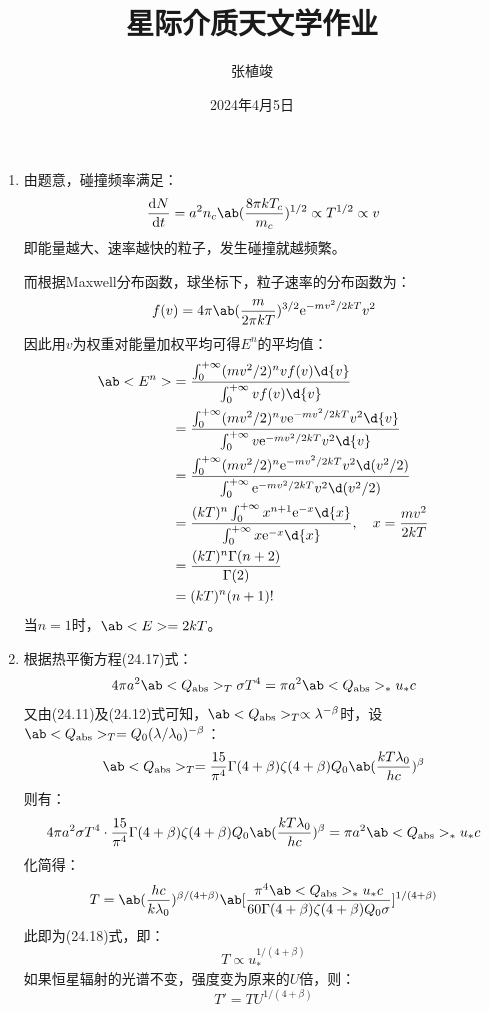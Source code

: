 \documentclass[a4paper,fontset=none]{ctexart}
\title{\textbf{星际介质天文学作业}}
\author{张植竣}
\date{2024年4月5日}
\begin{document}
\maketitle

\begin{enumerate}
    \item[24.1]
    由题意，碰撞频率满足：
    \[
        \odv{N}{t} = a^2 n_c \ab(\frac{8\pi kT_c}{m_c})^{1/2} \propto T^{1/2} \propto v
    \]
    即能量越大、速率越快的粒子，发生碰撞就越频繁。

    而根据Maxwell分布函数，球坐标下，粒子速率的分布函数为：
    \[
        f(v) = 4\pi \ab(\frac{m}{2\pi kT})^{3/2} \mathrm{e}^{-mv^2/2kT} v^2
    \]
    因此用$v$为权重对能量加权平均可得$E^n$的平均值：
    \begin{align*}
        \ab<E^n>
        &= \frac{\int_0^{+\infty} (mv^2/2)^n v f(v) \d{v}}{\int_0^{+\infty} v f(v) \d{v}} \\
        &= \frac{\int_0^{+\infty} (mv^2/2)^n v \mathrm{e}^{-mv^2/2kT} v^2 \d{v}}{\int_0^{+\infty} v \mathrm{e}^{-mv^2/2kT} v^2 \d{v}} \\
        &= \frac{\int_0^{+\infty} (mv^2/2)^n \mathrm{e}^{-mv^2/2kT} v^2 \d(v^2/2)}{\int_0^{+\infty} \mathrm{e}^{-mv^2/2kT} v^2 \d(v^2/2)} \\
        &= \frac{(kT)^n \int_0^{+\infty} x^{n+1} \mathrm{e}^{-x} \d{x}}{\int_0^{+\infty} x \mathrm{e}^{-x} \d{x}},\quad x = \frac{mv^2}{2kT} \\
        &= \frac{(kT)^n \Gamma(n+2)}{\Gamma(2)} \\
        &= (kT)^n (n+1)!
    \end{align*}
    当$n = 1$时，$\ab<E> = 2kT$。

    \bigskip
    \item[24.4 (a)]
    根据热平衡方程(24.17)式：
    \[
        4\pi a^2 \ab<Q_{\mathrm{abs}}>_{T} \sigma T^4 = \pi a^2 \ab<Q_{\mathrm{abs}}>_* u_* c
    \]
    又由(24.11)及(24.12)式可知，$\ab<Q_{\mathrm{abs}}>_T \propto \lambda^{-\beta}$时，设$\ab<Q_{\mathrm{abs}}>_T = Q_0(\lambda/\lambda_0)^{-\beta}$：
    \[
        \ab<Q_{\mathrm{abs}}>_T = \frac{15}{\pi^4} \Gamma(4+\beta) \zeta(4+\beta) Q_0 \ab(\frac{kT\lambda_0}{hc})^\beta
    \]
    则有：
    \[
        4\pi a^2 \sigma T^4 \cdot \frac{15}{\pi^4} \Gamma(4+\beta) \zeta(4+\beta) Q_0 \ab(\frac{kT\lambda_0}{hc})^\beta = \pi a^2 \ab<Q_{\mathrm{abs}}>_* u_* c
    \]
    化简得：
    \[
        T = \ab(\frac{hc}{k\lambda_0})^{\beta/(4+\beta)} \ab[\frac{\pi^4 \ab<Q_{\mathrm{abs}}>_* u_* c}{60 \Gamma(4+\beta) \zeta(4+\beta) Q_0\sigma}]^{1/(4+\beta)}
    \]
    此即为(24.18)式，即：
    \[
        T \propto u_*^{1/(4+\beta)}
    \]
    如果恒星辐射的光谱不变，强度变为原来的$U$倍，则：
    \[
        T' = T U^{1/(4+\beta)}
    \]


\end{enumerate}
\end{document}

